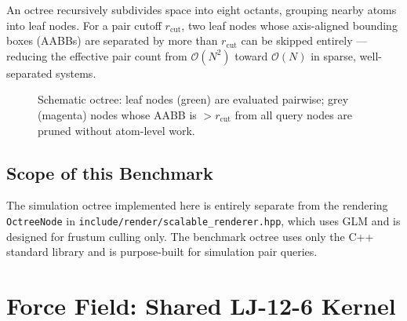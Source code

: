 \documentclass[11pt,a4paper]{article}
\theoremstyle{definition}
\theoremstyle{plain}
\newcommand{\Otwo}{\mathcal{O}(N^2)}
\newcommand{\rcut}{r_{\mathrm{cut}}}
\begin{document}
An octree recursively subdivides space into eight octants, grouping nearby
atoms into leaf nodes.  For a pair cutoff $\rcut$, two leaf nodes whose
axis-aligned bounding boxes (AABBs) are separated by more than $\rcut$ can
be skipped entirely — reducing the effective pair count from $\Otwo$ toward
$\mathcal{O}(N)$ in sparse, well-separated systems.

\begin{figure}[ht]
\centering
{}
\caption{Schematic octree: leaf nodes (green) are evaluated pairwise;
  grey (magenta) nodes whose AABB is $> \rcut$ from all query nodes are
  pruned without atom-level work.}
\label{fig:octree}
\end{figure}

\subsection{Scope of this Benchmark}

The simulation octree implemented here is entirely separate from the
rendering \texttt{OctreeNode} in \texttt{include/render/scalable\_renderer.hpp},
which uses GLM and is designed for frustum culling only.
The benchmark octree uses only the C++ standard library and is purpose-built
for simulation pair queries.

\section{Force Field: Shared LJ-12-6 Kernel}
\label{sec:ff}
\end{document}
